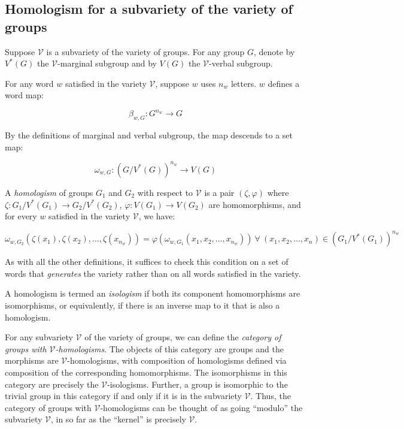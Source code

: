 \subsection{Homologism for a subvariety of the variety of groups}

Suppose $\mathcal{V}$ is a subvariety of the variety of groups. For any
group $G$, denote by $V^*(G)$ the $\mathcal{V}$-marginal subgroup and
by $V(G)$ the $\mathcal{V}$-verbal subgroup.

For any word $w$ satisfied in the variety $\mathcal{V}$, suppose $w$
uses $n_w$ letters. $w$ defines a word map:

$$\beta_{w,G}: G^{n_w} \to G$$

By the definitions of marginal and verbal subgroup, the map descends to a set map:

$$\omega_{w,G}: (G/V^*(G))^{n_w} \to V(G)$$

A {\em homologism} of groups $G_1$ and $G_2$ with respect to $\mathcal{V}$ is a pair $(\zeta,\varphi)$ where $\zeta: G_1/V^*(G_1) \to G_2/V^*(G_2)$, $\varphi: V(G_1) \to V(G_2)$ are homomorphisms, and for every $w$ satisfied in the variety $\mathcal{V}$, we have:

\begin{small}
$$\omega_{w,G_2}(\zeta(x_1), \zeta(x_2), \dots, \zeta(x_{n_w})) = \varphi(\omega_{w,G_1}(x_1,x_2,\dots, x_{n_w})) \ \forall \ (x_1,x_2,\dots,x_n) \in (G_1/V^*(G_1))^{n_w}$$
\end{small}

As with all the other definitions, it suffices to check this condition
on a set of words that {\em generates} the variety rather than on all
words satisfied in the variety.

A homologism is termed an {\em isologism} if both its component
homomorphisms are isomorphisms, or equivalently, if there is an
inverse map to it that is also a homologism.

For any subvariety $\mathcal{V}$ of the variety of groups, we can
define the {\em category of groups with
  $\mathcal{V}$-homologisms}. The objects of this category are groups
and the morphisms are $\mathcal{V}$-homologisms, with composition of
homologisms defined via composition of the corresponding
homomorphisms. The isomorphisms in this category are precisely the
$\mathcal{V}$-isologisms. Further, a group is isomorphic to the
trivial group in this category if and only if it is in the subvariety
$\mathcal{V}$. Thus, the category of groups with
$\mathcal{V}$-homologisms can be thought of as going ``modulo'' the
subvariety $\mathcal{V}$, in so far as the ``kernel'' is precisely
$\mathcal{V}$.

